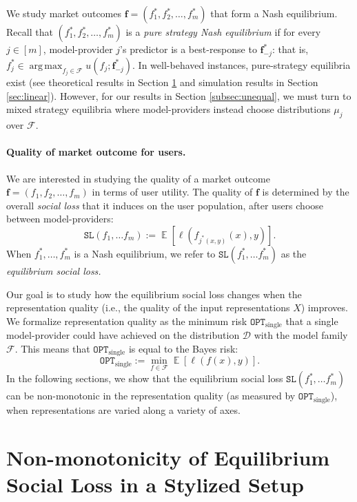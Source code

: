 \documentclass[letterpaper,11pt]{article}
\theoremstyle{plain}
\DeclareMathOperator*{\argmax}{arg\,max}
\DeclareMathOperator*{\E}{\mathbb{E}}
\begin{document}
We study market outcomes $\mathbf{f} = (f^*_1, f^*_2, \ldots, f^*_m)$ that form a Nash equilibrium. Recall that $(f^*_1, f^*_2, \ldots, f^*_m)$ is a \textit{pure strategy Nash equilibrium} if for every $j \in [m]$, model-provider $j$'s predictor is a best-response to $\mathbf{f}^*_{-j}$: that is, $f^*_j \in \argmax_{f_j\in \mathcal{F}} u(f_j; \mathbf{f}^*_{-j})$. In well-behaved instances, pure-strategy equilibria exist (see theoretical results in Section \ref{sec:theory} and simulation results in Section \ref{sec:linear}). However, for our results in Section \ref{subsec:unequal}, we must turn to mixed strategy equilibria where model-providers instead choose distributions $\mu_j$ over $\mathcal{F}$. 


\paragraph{Quality of market outcome for users.}
We are interested in studying the quality of a market outcome $\mathbf{f} = (f_1, f_2, \ldots, f_m)$ in terms of user utility. The quality of $\mathbf{f}$ is determined by the overall \textit{social loss} that it induces on the user population, after users choose between model-providers:
\begin{equation}
\label{eq:sociallossdef}
  \texttt{SL}(f_1, \ldots f_m) := \E[\ell(f_{j^*(x,y)}(x),y)]. 
\end{equation}
When $f^*_1, \ldots, f^*_m$ is a Nash equilibrium, we refer to $\texttt{SL}(f^*_1, \ldots f^*_m)$ as the \textit{equilibrium social loss.}

Our goal is to study how the equilibrium social loss changes when the representation quality (i.e., the quality of the input representations $X$) improves. We formalize representation quality as the minimum risk $\texttt{OPT}_{\text{single}}$ that a single model-provider could have achieved on the distribution $\mathcal{D}$ with the model family $\mathcal{F}$. This means that $\texttt{OPT}_{\text{single}}$ is equal to the Bayes risk:  
\[\texttt{OPT}_{\text{single}} := \min_{f \in \mathcal{F}} \E\left[ \ell(f(x),y)\right].\]
In the following sections, we show that the equilibrium social loss $\texttt{SL}(f^*_1, \ldots f^*_m)$ can be non-monotonic in the representation quality (as measured by $\texttt{OPT}_{\text{single}}$), when representations are varied along a variety of axes. 


\section{Non-monotonicity of Equilibrium Social Loss in a Stylized Setup}\label{sec:theory}
\end{document}
